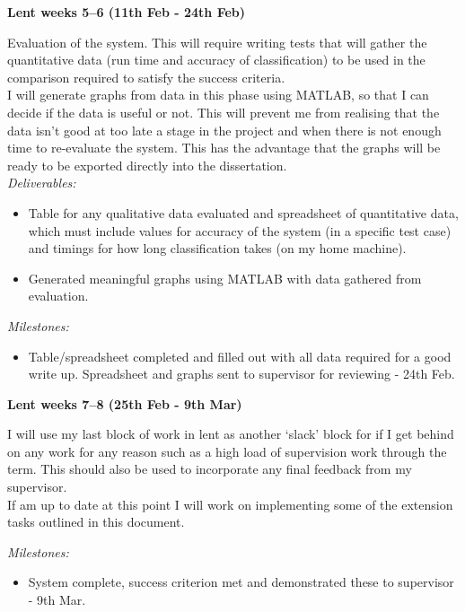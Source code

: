 \documentclass[12pt,a4paper,twoside]{article}
\begin{document}
{\bf Lent weeks 5--6 (11th Feb - 24th Feb)} 

Evaluation of the system. This will require writing tests that will gather 
the quantitative data (run time and accuracy of classification) to be used in 
the comparison required to satisfy the success criteria.\\

I will generate graphs from data in this phase using MATLAB, so that I can 
decide if the data is useful or not. This will prevent me from realising that 
the data isn't good at too late a stage in the project and when there is not 
enough time to re-evaluate the system. This has the advantage that the graphs 
will be ready to be exported directly into the dissertation. \\

{\em Deliverables:} 
\begin{itemize} 
    \item 
    Table for any qualitative data evaluated and spreadsheet of quantitative 
    data, which must include values for accuracy of the system (in a specific 
    test case) and timings for how long classification takes (on my home 
    machine).
    \item 
    Generated meaningful graphs using MATLAB with data gathered from evaluation.
\end{itemize}

{\em Milestones:}
\begin{itemize}
    \item 
    Table/spreadsheet completed and filled out with all data required for a good 
    write up. Spreadsheet and graphs sent to supervisor for reviewing - 24th Feb.
\end{itemize}




{\bf Lent weeks 7--8 (25th Feb - 9th Mar)} 

I will use my last block of work in lent as another `slack' block for if I get 
behind on any work for any reason such as a high load of supervision work 
through the term. This should also be used to incorporate any final feedback 
from my supervisor. \\

If am up to date at this point  I will work on implementing some of the 
extension tasks outlined in this document.

{\em Milestones:}
\begin{itemize}
    \item 
    System complete, success criterion met and demonstrated these to supervisor 
    - 9th Mar.
\end{itemize}
\end{document}
